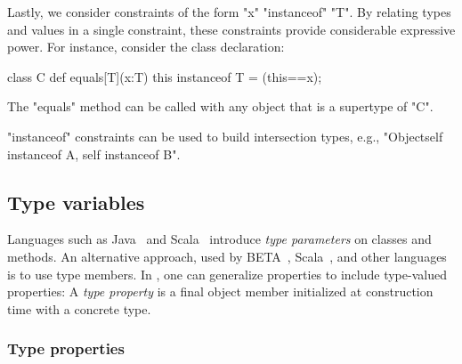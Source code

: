 Lastly, we consider constraints of the form \xcd"x" \xcd"instanceof" \xcd"T".
By relating types and values in a single constraint, 
these constraints provide considerable expressive power.
For instance, 
consider the class declaration:
\begin{xtennoindent}
class C {
  def equals[T](x:T) {this instanceof T} = (this==x);
}
\end{xtennoindent}
The \xcd"equals" method can be called with any object
that is a supertype of \xcd"C".

\xcd"instanceof" constraints can be used to build intersection
types, e.g., \xcd"Object{self instanceof A, self instanceof B}".

\subsection{Type variables}
\label{sec:type-properties}
\label{sec:variance}

Languages such as Java~\cite{Java3} and
Scala~\cite{scala} introduce \emph{type parameters} on classes
and methods.
An alternative approach, used by BETA~\cite{beta}, 
Scala~\cite{scala}, and other languages is to use type members.
In \Xten, one can
generalize properties to include type-valued properties:
A \emph{type property}
is a final object member initialized at construction time with a
concrete type.  

\subsubsection{Type properties}

\label{sec:usability}
\label{sec:parameters-vs-fields}

